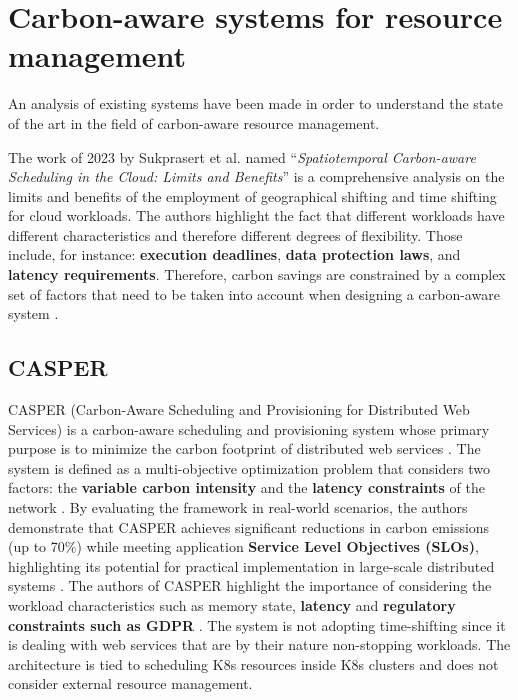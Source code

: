 \section{Carbon-aware systems for resource management}

An analysis of existing systems have been made in order to understand the state of the art in the field of carbon-aware resource management.

The work of 2023 by Sukprasert et al. named ``\textit{Spatiotemporal Carbon-aware Scheduling in the Cloud: Limits and Benefits}'' \cite{10.1145/3599733.3606301} is a comprehensive analysis on the limits and benefits of the employment of geographical shifting and time shifting for cloud workloads.
The authors highlight the fact that different workloads have different characteristics and therefore different degrees of flexibility. Those include, for instance: \textbf{execution deadlines}, \textbf{data protection laws}, and \textbf{latency requirements}. Therefore, carbon savings are constrained by a complex set of factors that need to be taken into account when designing a carbon-aware system \cite{10.1145/3599733.3606301}.

\subsection{CASPER}

CASPER (Carbon-Aware Scheduling and Provisioning for Distributed Web Services) is a carbon-aware scheduling and provisioning system whose primary purpose is to minimize the carbon footprint of distributed web services \cite{Souza_2023}.
The system is defined as a multi-objective optimization problem that considers two factors: the \textbf{variable carbon intensity} and the \textbf{latency constraints} of the network \cite{Souza_2023}.
By evaluating the framework in real-world scenarios, the authors demonstrate that CASPER achieves significant reductions in carbon emissions (up to 70\%) while meeting application \textbf{Service Level Objectives (SLOs)}, highlighting its potential for practical implementation in large-scale distributed systems \cite{Souza_2023}.
The authors of CASPER highlight the importance of considering the workload characteristics such as memory state, \textbf{latency} and \textbf{regulatory constraints such as GDPR} \cite{Souza_2023}.
The system is not adopting time-shifting since it is dealing with web services that are by their nature non-stopping workloads. The architecture is tied to scheduling K8s resources inside K8s clusters and does not consider external resource management.


